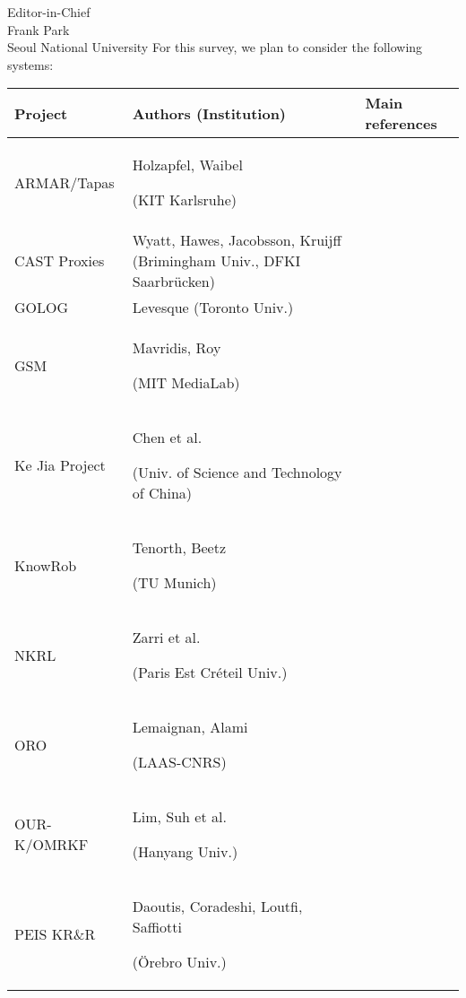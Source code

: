 \documentclass{letter}
\begin{document}
\begin{letter}{Editor-in-Chief \\ Frank Park \\ Seoul National University}
For this survey, we plan to consider the following systems:

\begin{tabular}{p{2.8cm}p{8cm}p{1.5cm}}
\toprule
{\bf Project} & {\bf Authors (Institution)} & Main references \\
\midrule
ARMAR/Tapas &  Holzapfel, Waibel \par (KIT Karlsruhe) &  \cite{Holzapfel2008}\\
CAST Proxies &  Wyatt, Hawes, Jacobsson, Kruijff (Brimingham Univ., DFKI Saarbrücken) &  \cite{Jacobsson2008} \\
GOLOG & Levesque (Toronto Univ.) & \cite{levesque1997golog} \\
GSM &  Mavridis, Roy \par (MIT MediaLab) & \cite{Mavridis2006} \\
Ke Jia Project & Chen et al. \par (Univ. of Science and Technology of China) &  \cite{Chen2010} \\
{\sc KnowRob} &  Tenorth, Beetz \par (TU Munich) &   \cite{Tenorth2009a} \\
NKRL &  Zarri et al. \par (Paris Est Créteil Univ.) &  \cite{Sabri2011} \\
ORO &  Lemaignan, Alami \par (LAAS-CNRS) &  \cite{Lemaignan2010} \\
OUR-K/OMRKF &  Lim, Suh et al. \par (Hanyang Univ.) &   \cite{Lim2011, Suh2007} \\
PEIS KR\&R &  Daoutis, Coradeshi, Loutfi, Saffiotti \par (Örebro Univ.) &  \cite{Daoutis2009} \\

\bottomrule


\end{tabular}
\end{letter}
\end{document}
